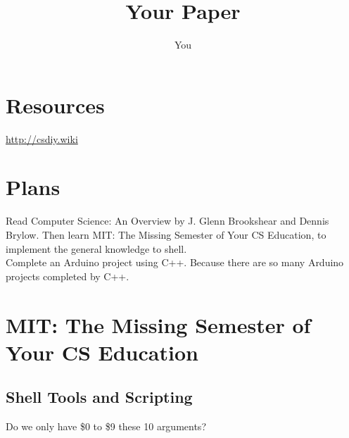 \documentclass{article}
\title{Your Paper}
\author{You}
\begin{document}
\maketitle

\section{Resources}
\url{http://csdiy.wiki}



\section{Plans}
Read Computer Science: An Overview by J. Glenn Brookshear and Dennis Brylow. Then learn MIT: The Missing Semester of Your CS Education, to implement the general knowledge to shell.\\
Complete an Arduino project using C++. Because there are so many Arduino projects completed by C++.

\section{MIT: The Missing Semester of Your CS Education}
\subsection{Shell Tools and Scripting}
Do we only have \$0 to \$9 these 10 arguments?
\end{document}
